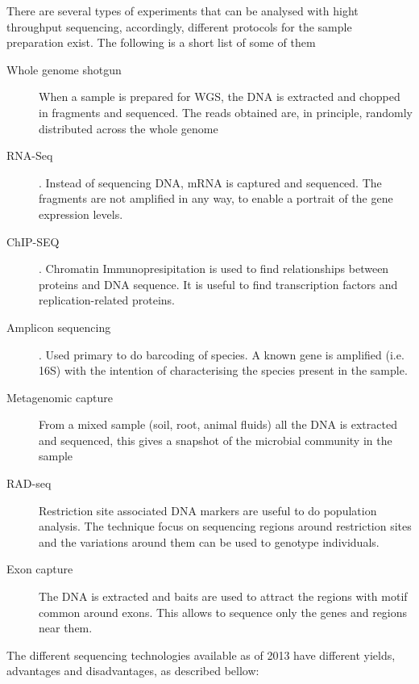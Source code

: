 There are several types of experiments that can be analysed with hight throughput sequencing, accordingly, different  protocols for the sample preparation exist. The following is a short list of some of them 

\begin{description}
\item[Whole genome shotgun]  When a sample is prepared for WGS, the DNA is extracted and chopped in fragments  and sequenced. The reads obtained are, in principle, randomly distributed across the whole genome
\item[RNA-Seq].  Instead of sequencing DNA, mRNA is captured and sequenced. The fragments are not amplified in any way, to enable a portrait of the gene expression levels. 
\item[ChIP-SEQ]. Chromatin Immunopresipitation is used to find relationships between proteins and DNA sequence. It is useful to find transcription factors and replication-related proteins.
\item[Amplicon sequencing]. Used primary to do barcoding of species. A known gene is amplified (i.e. 16S) with the intention of characterising the species present in the sample. 
\item[Metagenomic capture] From a mixed sample (soil, root, animal fluids) all the DNA is extracted and sequenced, this gives a snapshot of the microbial community in the sample
\item[RAD-seq] Restriction site associated DNA markers are useful to do population analysis. The technique focus on sequencing regions around restriction sites and the variations around them can be used to genotype individuals. 
\item[Exon capture] The DNA is extracted and baits are used to attract the regions with motif common around exons. This allows to sequence only the genes and regions near them.  
\end{description}


The different sequencing technologies available as of 2013 have different yields, advantages and disadvantages, as described bellow:

